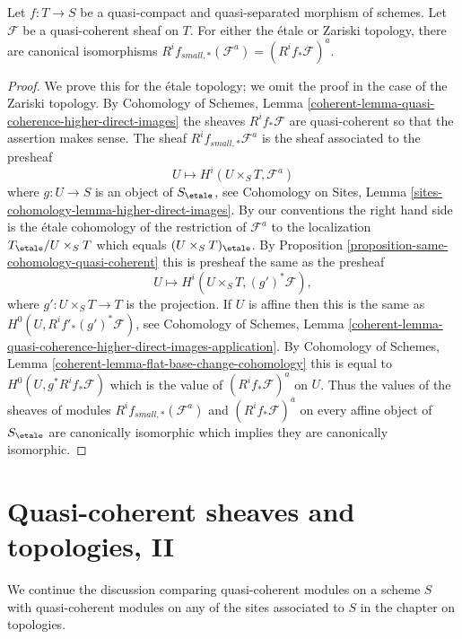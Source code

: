 \begin{lemma}
\label{lemma-higher-direct-images-small-etale}
Let $f : T \to S$ be a quasi-compact and quasi-separated morphism of schemes.
Let $\mathcal{F}$ be a quasi-coherent sheaf on $T$. For either the \'etale
or Zariski topology, there are canonical isomorphisms
$R^if_{small, *}(\mathcal{F}^a) = (R^if_*\mathcal{F})^a$.
\end{lemma}

\begin{proof}
We prove this for the \'etale topology; we omit the proof in the case
of the Zariski topology. By Cohomology of Schemes, Lemma
\ref{coherent-lemma-quasi-coherence-higher-direct-images}
the sheaves $R^if_*\mathcal{F}$ are quasi-coherent so that the assertion
makes sense. The sheaf $R^if_{small, *}\mathcal{F}^a$ is the sheaf associated
to the presheaf
$$
U \longmapsto H^i(U \times_S T, \mathcal{F}^a)
$$
where $g : U \to S$ is an object of $S_\etale$, see
Cohomology on Sites, Lemma \ref{sites-cohomology-lemma-higher-direct-images}.
By our conventions the right hand side is the \'etale
cohomology of the restriction of $\mathcal{F}^a$ to the localization
$T_\etale/U \times_S T$ which equals
$(U \times_S T)_\etale$. By
Proposition \ref{proposition-same-cohomology-quasi-coherent}
this is presheaf the same as the presheaf
$$
U \longmapsto
H^i(U \times_S T, (g')^*\mathcal{F}),
$$
where $g' : U \times_S T \to T$ is the projection. If $U$ is affine
then this is the same as $H^0(U, R^if'_*(g')^*\mathcal{F})$, see
Cohomology of Schemes, Lemma
\ref{coherent-lemma-quasi-coherence-higher-direct-images-application}.
By
Cohomology of Schemes, Lemma \ref{coherent-lemma-flat-base-change-cohomology}
this is equal to $H^0(U, g^*R^if_*\mathcal{F})$ which is the value
of $(R^if_*\mathcal{F})^a$ on $U$.
Thus the values of the sheaves of modules
$R^if_{small, *}(\mathcal{F}^a)$ and $(R^if_*\mathcal{F})^a$
on every affine object of $S_\etale$ are canonically isomorphic
which implies they are canonically isomorphic.
\end{proof}




\section{Quasi-coherent sheaves and topologies, II}
\label{section-quasi-coherent-sheaves-bis}

\noindent
We continue the discussion comparing quasi-coherent modules on a scheme $S$
with quasi-coherent modules on any of the sites associated to $S$
in the chapter on topologies.


